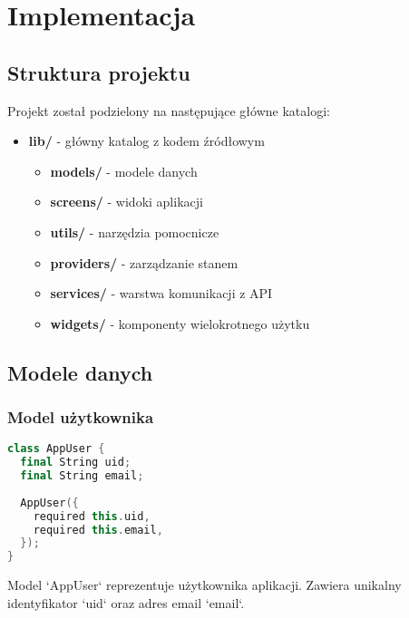 \newpage
\section{Implementacja}		%

\subsection{Struktura projektu}

Projekt został podzielony na następujące główne katalogi:

\begin{itemize}
  \item \textbf{lib/} - główny katalog z kodem źródłowym
    \begin{itemize}
      \item \textbf{models/} - modele danych
      \item \textbf{screens/} - widoki aplikacji
      \item \textbf{utils/} - narzędzia pomocnicze
      \item \textbf{providers/} - zarządzanie stanem
      \item \textbf{services/} - warstwa komunikacji z API
      \item \textbf{widgets/} - komponenty wielokrotnego użytku
    \end{itemize}
\end{itemize}

\subsection{Modele danych}

\subsubsection{Model użytkownika}
\begin{lstlisting}[language=C++, caption=Model użytkownika, label={lst:user-model}]
class AppUser {
  final String uid;
  final String email;
  
  AppUser({
    required this.uid,
    required this.email,
  });
}
\end{lstlisting}
Model `AppUser` reprezentuje użytkownika aplikacji. Zawiera unikalny identyfikator `uid` oraz adres email `email`.
\newpage
